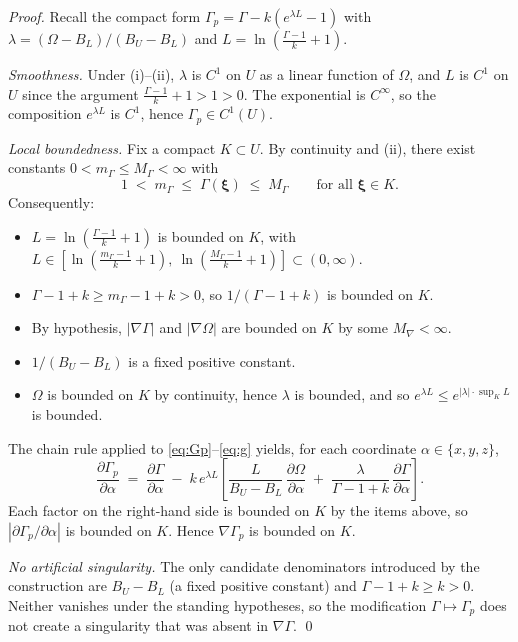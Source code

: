 \documentclass[11pt]{article}
\theoremstyle{remark}
\newcommand{\G}{\Gamma}
\newcommand{\Gp}{\Gamma_p}
\newcommand{\Om}{\Omega}
\newcommand{\xib}{\bm{\xi}}
\begin{document}
\begin{proof}
Recall the compact form $\Gp = \G - k(e^{\lambda L}-1)$ with $\lambda = (\Om-B_L)/(B_U-B_L)$ and $L = \ln\!\left(\tfrac{\G-1}{k}+1\right)$.

\smallskip
\noindent\emph{Smoothness.} Under (i)--(ii), $\lambda$ is $C^{1}$ on $U$ as a linear function of $\Om$, and $L$ is $C^{1}$ on $U$ since the argument $\tfrac{\G-1}{k}+1>1>0$. The exponential is $C^{\infty}$, so the composition $e^{\lambda L}$ is $C^{1}$, hence $\Gp\in C^{1}(U)$.

\smallskip
\noindent\emph{Local boundedness.} Fix a compact $K\subset U$. By continuity and (ii), there exist constants $0<m_{\G}\le M_{\G}<\infty$ with
\[
    1 \;<\; m_{\G} \;\le\; \G(\xib) \;\le\; M_{\G} \qquad\text{for all }\xib\in K.
\]
Consequently:
\begin{itemize}
    \item $L = \ln\!\left(\tfrac{\G-1}{k}+1\right)$ is bounded on $K$, with
    $L\in\!\left[\ln\!\left(\tfrac{m_{\G}-1}{k}+1\right),\ \ln\!\left(\tfrac{M_{\G}-1}{k}+1\right)\right]\!\subset(0,\infty)$.
    \item $\G-1+k\ge m_{\G}-1+k>0$, so $1/(\G-1+k)$ is bounded on $K$.
    \item By hypothesis, $|\nabla\G|$ and $|\nabla\Om|$ are bounded on $K$ by some $M_{\nabla}<\infty$.
    \item $1/(B_U-B_L)$ is a fixed positive constant.
    \item $\Om$ is bounded on $K$ by continuity, hence $\lambda$ is bounded, and so $e^{\lambda L}\le e^{|\lambda|\cdot\sup_K L}$ is bounded.
\end{itemize}
The chain rule applied to \eqref{eq:Gp}--\eqref{eq:g} yields, for each coordinate $\alpha\in\{x,y,z\}$,
\[
    \frac{\partial\Gp}{\partial\alpha}
    \;=\; \frac{\partial\G}{\partial\alpha}
        \;-\; k\,e^{\lambda L}\!\left[
            \frac{L}{B_U-B_L}\,\frac{\partial\Om}{\partial\alpha}
            \;+\; \frac{\lambda}{\G-1+k}\,\frac{\partial\G}{\partial\alpha}
        \right].
\]
Each factor on the right-hand side is bounded on $K$ by the items above, so $|\partial\Gp/\partial\alpha|$ is bounded on $K$. Hence $\nabla\Gp$ is bounded on $K$.

\smallskip
\noindent\emph{No artificial singularity.} The only candidate denominators introduced by the construction are $B_U-B_L$ (a fixed positive constant) and $\G-1+k\ge k>0$. Neither vanishes under the standing hypotheses, so the modification $\G\mapsto\Gp$ does not create a singularity that was absent in $\nabla\G$. \qed
\end{proof}
\end{document}
